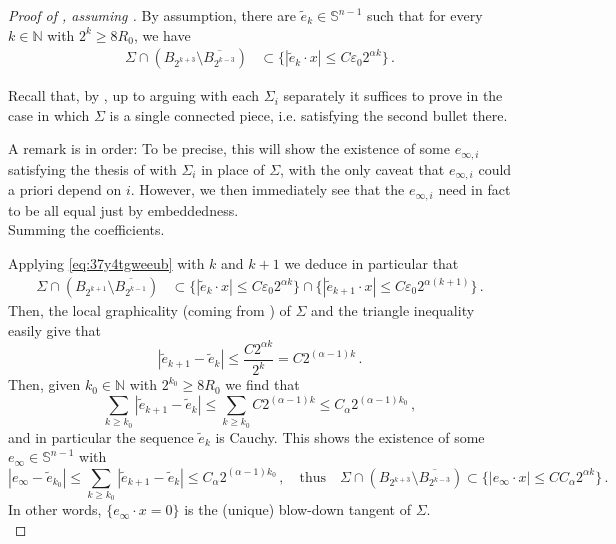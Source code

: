 \documentclass{article}
\newcommand{\N}{\mathbb{N}}
\newcommand{\Sp}{\mathbb{S}}
\newcommand{\ep}{\varepsilon}
\theoremstyle{definition}
\begin{document}
\begin{proof}[Proof of , assuming ]
    By assumption, there are $\widetilde e_k\in\Sp^{n-1}$ such that for every $k\in\N$ with $2^k\geq 8R_0$, we have
\begin{align}\label{eq:37y4tgweeub}
    \Sigma \cap (B_{2^{k+3}}\setminus \overline{B_{2^{k-3}}})&\subset \{|\widetilde e_k\cdot x|\leq C\ep_0 2^{\alpha k}\}\,.
\end{align}

Recall that, by , up to arguing with each $\Sigma_i$ separately it suffices to prove  in the case in which $\Sigma$ is a single connected piece, i.e. satisfying the second bullet there.

A remark is in order: To be precise, this will show the existence of some $e_{\infty,i}$ satisfying the thesis of  with $\Sigma_i$ in place of $\Sigma$, with the only caveat that $e_{\infty,i}$ could a priori depend on $i$. However, we then immediately see that the $e_{\infty,i}$ need in fact to be all equal just by embeddedness.\\

 Summing the coefficients.

Applying \eqref{eq:37y4tgweeub} with $k$ and $k+1$ we deduce in particular that
\begin{align}\label{eq:t2831t41gtq}
    \Sigma \cap (B_{2^{k+1}}\setminus \overline{B_{2^{k-1}}})&\subset \{|\widetilde e_k\cdot x|\leq C\ep_0 2^{\alpha k}\}\cap \{|\widetilde e_{k+1}\cdot x|\leq C\ep_0 2^{\alpha (k+1)}\}\,.
\end{align}
Then,  the local graphicality (coming from ) of $\Sigma$ and the triangle inequality easily give that
$$|\widetilde e_{k+1}-\widetilde e_k|\leq \frac{C 2^{\alpha k}}{2^k}=C2^{(\alpha-1)k}\,.$$
Then, given $k_0\in \N$ with $2^{k_0}\geq 8R_0$ we find that
$$\sum_{k\geq k_0} |\widetilde e_{k+1}-\widetilde e_k|\leq \sum_{k\geq k_0} C2^{(\alpha-1)k} \leq C_\alpha 2^{(\alpha-1)k_0}\,,$$
and in particular the sequence $\widetilde e_k$ is Cauchy. This shows the existence of some $ e_\infty\in \Sp^{n-1}$ with
\begin{equation}\label{eq:q7toagvg}
    | e_\infty-\widetilde e_{k_0}|\leq \sum_{k\geq k_0} |\widetilde e_{k+1}-\widetilde e_k|\leq C_\alpha 2^{(\alpha-1)k_0}\,,\quad\mbox{thus}\quad \Sigma \cap (B_{2^{k+3}}\setminus \overline{B_{2^{k-3}}})\subset \{| e_\infty\cdot x|\leq CC_\alpha 2^{\alpha k}\}\,.
\end{equation}
In other words, $\{e_\infty\cdot x=0\}$ is the (unique) blow-down tangent of $\Sigma$.\\


\end{proof}
\end{document}

